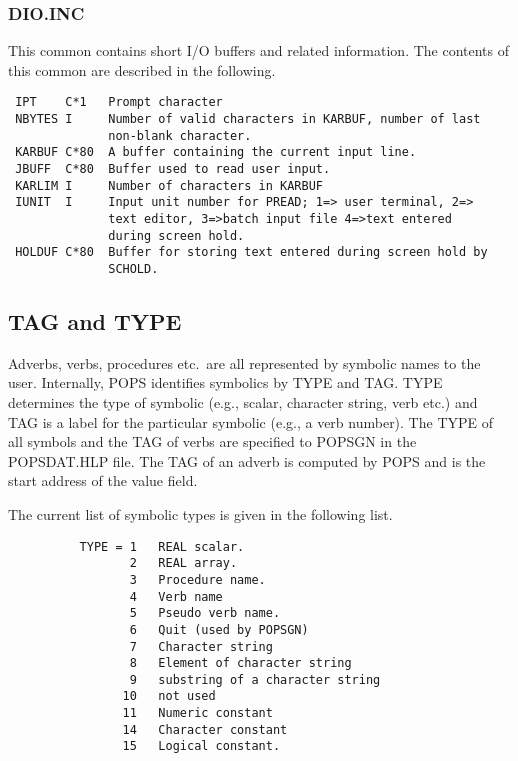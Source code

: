 \subsubsection{DIO.INC}
This common contains short I/O buffers and related information. The
contents of this common are described in the following.

\begin{verbatim}
 IPT    C*1   Prompt character
 NBYTES I     Number of valid characters in KARBUF, number of last
              non-blank character.
 KARBUF C*80  A buffer containing the current input line.
 JBUFF  C*80  Buffer used to read user input.
 KARLIM I     Number of characters in KARBUF
 IUNIT  I     Input unit number for PREAD; 1=> user terminal, 2=>
              text editor, 3=>batch input file 4=>text entered
              during screen hold.
 HOLDUF C*80  Buffer for storing text entered during screen hold by
              SCHOLD.

\end{verbatim}

\subsection{TAG and TYPE }
Adverbs, verbs, procedures etc.~are all represented by symbolic names
to the user.  Internally, POPS identifies symbolics by TYPE and TAG.
TYPE determines the type of symbolic (e.g., scalar, character string,
verb etc.) and TAG is a label for the particular symbolic (e.g., a
verb number).  The TYPE of all symbols and the TAG of verbs are
specified to POPSGN in the POPSDAT.HLP file.  The TAG of an adverb is
computed by POPS and is the start address of the value field.

The current list of symbolic types is given in the following list.

\begin{verbatim}
          TYPE = 1   REAL scalar.
                 2   REAL array.
                 3   Procedure name.
                 4   Verb name
                 5   Pseudo verb name.
                 6   Quit (used by POPSGN)
                 7   Character string
                 8   Element of character string
                 9   substring of a character string
                10   not used
                11   Numeric constant
                14   Character constant
                15   Logical constant.

\end{verbatim}

